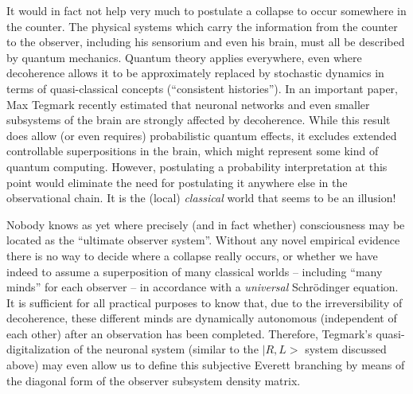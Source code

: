 \documentclass[12pt]{article}
\begin{document}
It would in fact not help very much to postulate a collapse to occur
somewhere in the counter. The physical systems which carry the
information from the counter to the observer, including his sensorium
and even his brain, must all be described by quantum mechanics.
Quantum theory applies everywhere, even where
decoherence allows it to be approximately replaced by stochastic
dynamics in terms of quasi-classical
concepts (``consistent histories''). In an important paper, Max
Tegmark \cite{tegmark} recently estimated that neuronal networks and
even smaller subsystems of the brain are strongly affected by
decoherence. While this result does allow (or even requires)
probabilistic quantum effects, it excludes extended controllable
superpositions in the brain, which might represent some kind of
quantum computing. However, postulating a probability interpretation
at this point would eliminate the need for postulating it anywhere
else in the observational chain. It is the (local) {\it
classical} world that seems to be an illusion!

Nobody knows as yet where precisely (and in fact whether) consciousness
may be located as the ``ultimate observer system''. Without
any novel empirical evidence there is no way to decide where a
collapse really occurs, or whether we have indeed to assume a
superposition of many classical worlds -- including ``many minds''
\cite{ZConsc} for each observer -- in accordance with a {\it universal}
Schr\"odinger equation. It is sufficient for all practical purposes to
know that, due to the irreversibility of decoherence, these different
minds are dynamically autonomous (independent of each other) after an
observation has been completed. Therefore, Tegmark's
quasi-digitalization of the neuronal system (similar to the $|R,L>$
system discussed above) may even allow us to define this subjective
Everett branching by means of the diagonal form of the observer
subsystem density matrix.
\end{document}
